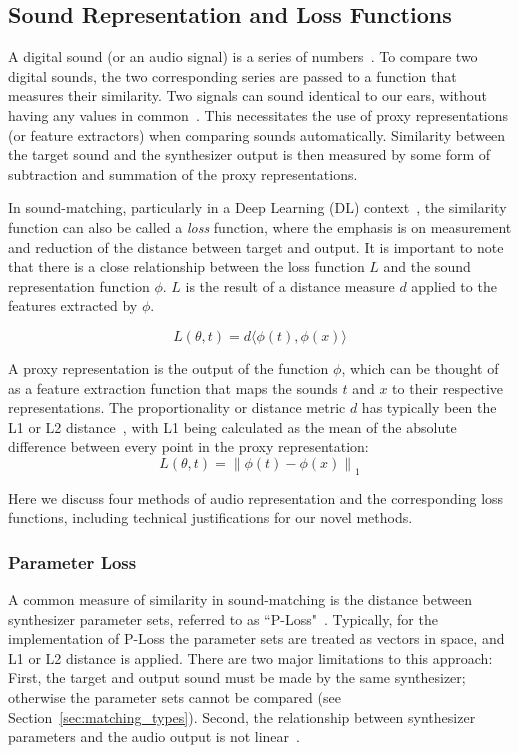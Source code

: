 \subsection{Sound Representation and Loss Functions}
\label{sec:loss_funcs}
A digital sound (or an audio signal) is a series of numbers~\cite{smith1991viewpoints,smith2007mathematics}. To compare two digital sounds, the two corresponding series are passed to a function that measures their similarity. Two signals can sound identical to our ears, without having any values in common~\cite{moore2012introduction}. This necessitates the use of proxy representations (or feature extractors) when comparing sounds automatically. Similarity between the target sound and the synthesizer output is then measured by some form of subtraction and summation of the proxy representations.

In sound-matching, particularly in a Deep Learning (\gls{DL}) context~\cite{goodfellow2016deep}, the similarity function can also be called a \textit{loss} function, where the emphasis is on measurement and reduction of the distance between target and output. It is important to note that there is a close relationship between the loss function $L$ and the sound representation function $\phi$. $L$ is the result of a distance measure $d$ applied to the features extracted by $\phi$. 

\[
L(\theta, t) = d\langle\phi(t),\phi(x)\rangle
\]

\noindent

A proxy representation is the output of the function \( \phi \), which can be thought of as a feature extraction function that maps the sounds \( t \) and \( x \) to their respective representations. 
The proportionality or distance metric $d$ has typically been the L1 or L2 distance~\cite{turian2020sorry,richard2025model}, with L1 being calculated as the mean of the absolute difference between every point in the proxy representation:
\[
L(\theta, t) = \left\| \phi(t) - \phi(x) \right\|_1
\]

Here we discuss four methods of audio representation and the corresponding loss functions, including technical justifications for our novel methods.

\subsubsection{Parameter Loss}
A common measure of similarity in sound-matching is the distance between synthesizer parameter sets, referred to as ``P-Loss"~\cite{han2023perceptual}. Typically, for the implementation of P-Loss the parameter sets are treated as vectors in space, and L1 or L2 distance is applied. There are two major limitations to this approach: First, the target and output sound must be made by the same synthesizer; otherwise the parameter sets cannot be compared (see Section~\ref{sec:matching_types}). Second, the relationship between synthesizer parameters and the audio output is not linear~\cite{shier2020spiegelib,han2023perceptual,esling2019flow}. 

